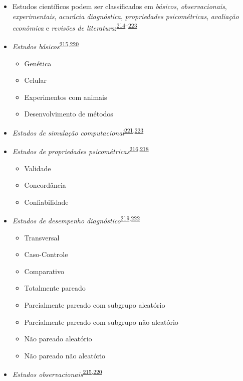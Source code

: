 \documentclass[
  a4paper,
]{book}
\begin{document}
\begin{itemize}
\item
  Estudos científicos podem ser classificados em \emph{básicos}, \emph{observacionais}, \emph{experimentais}, \emph{acurácia diagnóstica}, \emph{propriedades psicométricas}, \emph{avaliação econômica} e \emph{revisões de literatura}:\textsuperscript{\protect\hyperlink{ref-Grant2009}{214}--\protect\hyperlink{ref-chipman2022}{223}}
\item
  \emph{Estudos básicos}\textsuperscript{\protect\hyperlink{ref-Suxfct2014}{215},\protect\hyperlink{ref-Chidambaram2019}{220}}

  \begin{itemize}
  \item
    Genética
  \item
    Celular
  \item
    Experimentos com animais
  \item
    Desenvolvimento de métodos
  \end{itemize}
\item
  \emph{Estudos de simulação computacional}\textsuperscript{\protect\hyperlink{ref-Erdemir2020}{221},\protect\hyperlink{ref-chipman2022}{223}}
\item
  \emph{Estudos de propriedades psicométricas}\textsuperscript{\protect\hyperlink{ref-Souza2017}{216},\protect\hyperlink{ref-echevarruxeda-guanilo2019}{218}}

  \begin{itemize}
  \item
    Validade
  \item
    Concordância
  \item
    Confiabilidade
  \end{itemize}
\item
  \emph{Estudos de desempenho diagnóstico}\textsuperscript{\protect\hyperlink{ref-Chassuxe92019}{219},\protect\hyperlink{ref-Yang2021}{222}}

  \begin{itemize}
  \item
    Transversal
  \item
    Caso-Controle
  \item
    Comparativo
  \item
    Totalmente pareado
  \item
    Parcialmente pareado com subgrupo aleatório
  \item
    Parcialmente pareado com subgrupo não aleatório
  \item
    Não pareado aleatório
  \item
    Não pareado não aleatório
  \end{itemize}
\item
  \emph{Estudos observacionais}\textsuperscript{\protect\hyperlink{ref-Suxfct2014}{215},\protect\hyperlink{ref-Chidambaram2019}{220}}


\end{itemize}
\end{document}

